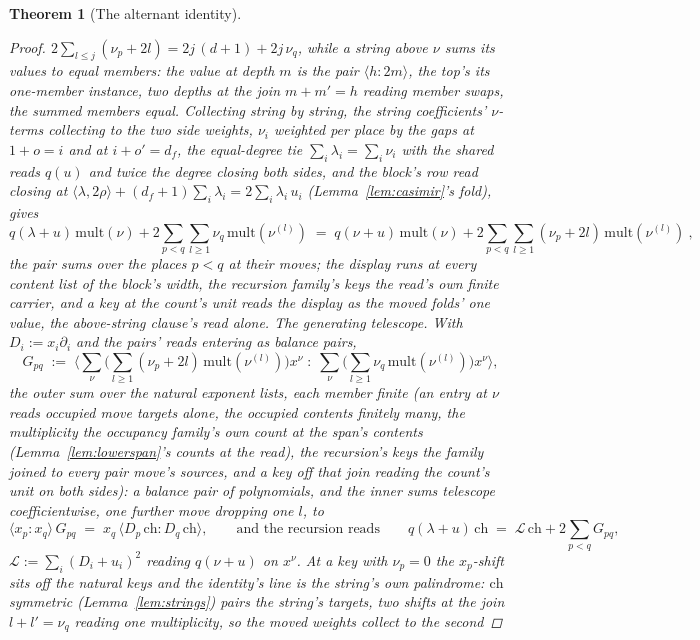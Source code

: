 \documentclass[11pt]{article}
\newtheorem{theorem}{Theorem}
\theoremstyle{definition}
\begin{document}
\begin{theorem}[The alternant identity]
\begin{proof}
$2\sum_{l\le j}(\nu_p{+}2l)=2j\,(d{+}1)+2j\,\nu_q$, while a string
above $\nu$ sums its values to equal members: the value at depth $m$ is
the pair
$\langle h\!:\!2m\rangle$, the top's its one-member instance, two
depths at the join $m+m'=h$ reading
member swaps, the summed members equal.
Collecting string by string, the string coefficients' $\nu$-terms
collecting to the two side weights, $\nu_i$ weighted per place by
the gaps at $1+o=i$ and at $i+o'=d_f$, the equal-degree tie
$\sum_i\lambda_i=\sum_i\nu_i$ with the shared reads $q(u)$ and
twice the degree closing both sides, and the block's row read closing
at
$\langle\lambda,2\rho\rangle+(d_f{+}1)\sum_i\lambda_i
=2\sum_i\lambda_i\,u_i$ (Lemma~\ref{lem:casimir}'s fold), gives
\[
q(\lambda{+}u)\,\mathrm{mult}(\nu)
+2\sum_{p<q}\sum_{l\ge1}\nu_q\,\mathrm{mult}(\nu^{(l)})
\;=\;
q(\nu{+}u)\,\mathrm{mult}(\nu)
+2\sum_{p<q}\sum_{l\ge1}(\nu_p{+}2l)\,\mathrm{mult}(\nu^{(l)})\ ,
\]
the pair sums over the places $p<q$ at their moves; the display
runs at every content list of the block's width, the recursion
family's keys the read's own finite carrier, and a key at the
count's unit reads the display as the moved folds' one value, the
above-string clause's read alone.
\emph{The generating telescope.} With $D_i:=x_i\partial_i$ and the
pairs' reads entering as balance pairs,
\[
G_{pq}\;:=\;\Big\langle
\sum_\nu\Big(\sum_{l\ge1}(\nu_p{+}2l)\,
\mathrm{mult}(\nu^{(l)})\Big)x^\nu
\;:\;
\sum_\nu\Big(\sum_{l\ge1}\nu_q\,
\mathrm{mult}(\nu^{(l)})\Big)x^\nu
\Big\rangle ,
\]
the outer sum over the natural exponent lists, each member finite (an
entry at $\nu$ reads occupied move targets alone,
the occupied contents finitely many, the multiplicity the occupancy
family's own count at the span's contents
(Lemma~\ref{lem:lowerspan}'s counts at the read), the recursion's
keys the family joined to every pair move's sources, and a key off
that join reading the count's unit on both sides): a balance pair
of polynomials,
and the inner sums telescope
coefficientwise, one further move dropping one $l$, to
\[
\langle x_p\!:\!x_q\rangle\,G_{pq}
\;=\;x_q\,\langle D_p\,\mathrm{ch}\!:\!D_q\,\mathrm{ch}\rangle ,
\qquad\text{and the recursion reads}\qquad
q(\lambda{+}u)\,\mathrm{ch}
\;=\;\mathcal L\,\mathrm{ch}+2\sum_{p<q}G_{pq} ,
\]
$\mathcal L:=\sum_i(D_i+u_i)^2$ reading $q(\nu{+}u)$ on $x^\nu$.
At a key with $\nu_p=0$ the $x_p$-shift sits off the natural keys
and the identity's line is the string's own palindrome:
$\mathrm{ch}$ symmetric (Lemma~\ref{lem:strings}) pairs the
string's targets, two shifts at the join $l+l'=\nu_q$ reading one
multiplicity, so the moved weights collect to the second

\end{proof}
\end{theorem}
\end{document}
